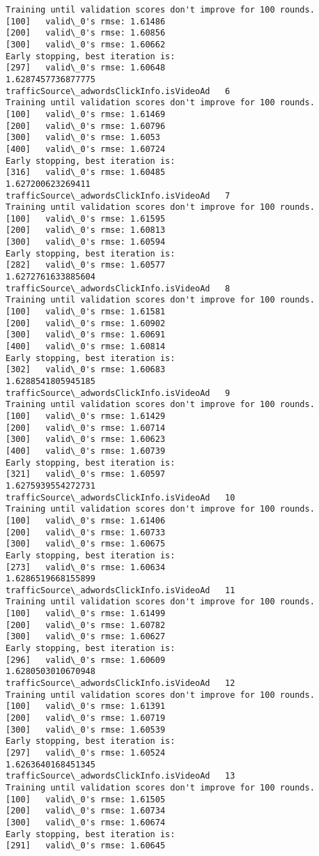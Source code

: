 \documentclass[11pt]{article}
\begin{document}
\begin{Verbatim}[commandchars=\\\{\}]
Training until validation scores don't improve for 100 rounds.
[100]	valid\_0's rmse: 1.61486
[200]	valid\_0's rmse: 1.60856
[300]	valid\_0's rmse: 1.60662
Early stopping, best iteration is:
[297]	valid\_0's rmse: 1.60648
1.6287457736877775
trafficSource\_adwordsClickInfo.isVideoAd   6
Training until validation scores don't improve for 100 rounds.
[100]	valid\_0's rmse: 1.61469
[200]	valid\_0's rmse: 1.60796
[300]	valid\_0's rmse: 1.6053
[400]	valid\_0's rmse: 1.60724
Early stopping, best iteration is:
[316]	valid\_0's rmse: 1.60485
1.627200623269411
trafficSource\_adwordsClickInfo.isVideoAd   7
Training until validation scores don't improve for 100 rounds.
[100]	valid\_0's rmse: 1.61595
[200]	valid\_0's rmse: 1.60813
[300]	valid\_0's rmse: 1.60594
Early stopping, best iteration is:
[282]	valid\_0's rmse: 1.60577
1.6272761633885604
trafficSource\_adwordsClickInfo.isVideoAd   8
Training until validation scores don't improve for 100 rounds.
[100]	valid\_0's rmse: 1.61581
[200]	valid\_0's rmse: 1.60902
[300]	valid\_0's rmse: 1.60691
[400]	valid\_0's rmse: 1.60814
Early stopping, best iteration is:
[302]	valid\_0's rmse: 1.60683
1.6288541805945185
trafficSource\_adwordsClickInfo.isVideoAd   9
Training until validation scores don't improve for 100 rounds.
[100]	valid\_0's rmse: 1.61429
[200]	valid\_0's rmse: 1.60714
[300]	valid\_0's rmse: 1.60623
[400]	valid\_0's rmse: 1.60739
Early stopping, best iteration is:
[321]	valid\_0's rmse: 1.60597
1.6275939554272731
trafficSource\_adwordsClickInfo.isVideoAd   10
Training until validation scores don't improve for 100 rounds.
[100]	valid\_0's rmse: 1.61406
[200]	valid\_0's rmse: 1.60733
[300]	valid\_0's rmse: 1.60675
Early stopping, best iteration is:
[273]	valid\_0's rmse: 1.60634
1.6286519668155899
trafficSource\_adwordsClickInfo.isVideoAd   11
Training until validation scores don't improve for 100 rounds.
[100]	valid\_0's rmse: 1.61499
[200]	valid\_0's rmse: 1.60782
[300]	valid\_0's rmse: 1.60627
Early stopping, best iteration is:
[296]	valid\_0's rmse: 1.60609
1.6280503010670948
trafficSource\_adwordsClickInfo.isVideoAd   12
Training until validation scores don't improve for 100 rounds.
[100]	valid\_0's rmse: 1.61391
[200]	valid\_0's rmse: 1.60719
[300]	valid\_0's rmse: 1.60539
Early stopping, best iteration is:
[297]	valid\_0's rmse: 1.60524
1.6263640168451345
trafficSource\_adwordsClickInfo.isVideoAd   13
Training until validation scores don't improve for 100 rounds.
[100]	valid\_0's rmse: 1.61505
[200]	valid\_0's rmse: 1.60734
[300]	valid\_0's rmse: 1.60674
Early stopping, best iteration is:
[291]	valid\_0's rmse: 1.60645

\end{Verbatim}
\end{document}
